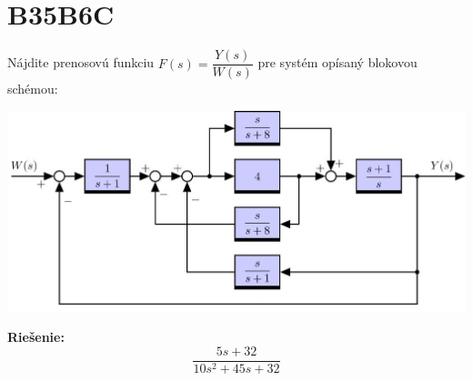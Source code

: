 \documentclass[a4paper, 12pt]{article}
\newenvironment{task}{}{}
\newenvironment{solution}{\noindent\textbf{Riešenie:}}{}
\begin{document}
\section*{B35B6C}
\begin{task}
    Nájdite prenosovú funkciu $F(s)=\dfrac{Y(s)}{W(s)}$ pre systém opísaný blokovou schémou:

    \includegraphics{../images/blokovka02_00004.jpg}
\end{task} 

\begin{solution}
    \begin{equation*}
        \dfrac{5s+32}{10s^2+45s+32}
    \end{equation*}
\end{solution}
\end{document}
